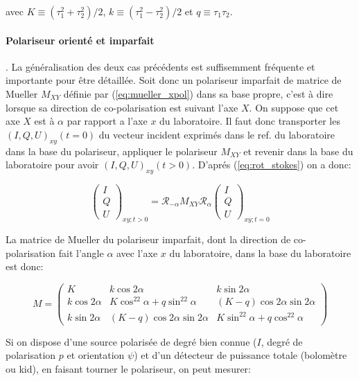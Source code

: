 \documentclass[a4paper,10pt]{article}
\begin{document}
avec $K\equiv(\tau_1^2 + \tau_2^2)/2$, $k\equiv(\tau_1^2-\tau_2^2)/2$
et $q\equiv\tau_1\tau_2$.

\paragraph{Polariseur orient\'e et imparfait}. La g\'en\'eralisation
des deux cas pr\'ec\'edents est suffisemment fr\'equente et importante
pour \^etre d\'etaill\'ee. Soit donc un polariseur imparfait de
matrice de Mueller $M_{XY}$ d\'efinie par (\ref{eq:mueller_xpol})
dans sa base propre, c'est \`a dire lorsque sa direction de
co-polarisation est suivant l'axe $X$. On suppose que cet axe $X$ est
\`a $\alpha$ par rapport a l'axe $x$ du laboratoire. Il faut donc
transporter les $(I,Q,U)_{xy}(t=0)$ du vecteur incident exprim\'es
dans le ref. du laboratoire dans la base du polariseur, appliquer le
polariseur $M_{XY}$ et revenir dans la base du laboratoire pour avoir
$(I,Q,U)_{xy}(t>0)$. D'apr\'es (\ref{eq:rot_stokes}) on a donc:

\begin{equation}
\left(\begin{array}{c}I\\Q\\U\end{array}\right)_{xy;t>0}
=
\mathcal{R_{-\alpha}}M_{XY}\mathcal{R_\alpha}
\left(\begin{array}{c}I\\Q\\U\end{array}\right)_{xy;t=0}
\end{equation}

La matrice de Mueller du polariseur imparfait, dont la direction de
co-polarisation fait l'angle $\alpha$ avec l'axe $x$ du laboratoire,
dans la base du laboratoire est donc:

\begin{equation}
M = \left(\begin{array}{rrr}
K & k\cos2\alpha & k\sin2\alpha \\
k\cos2\alpha & K\cos^22\alpha + q\sin^22\alpha & (K-q)\cos2\alpha\sin2\alpha \\
k\sin2\alpha & (K-q)\cos2\alpha\sin2\alpha & K\sin^22\alpha + q\cos^22\alpha
\end{array}\right)
\label{eq:mueller_xpol_alpha}
\end{equation}

Si on dispose d'une source polaris\'ee de degr\'e bien connue ($I$, degr\'e de
polarisation $p$ et orientation $\psi$) et d'un d\'etecteur de puissance totale
(bolom\`etre ou kid), en faisant tourner le polariseur, on peut mesurer:
\end{document}
